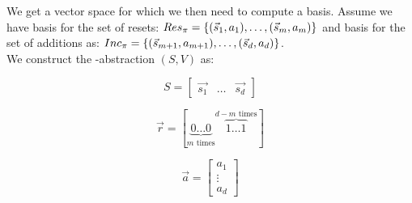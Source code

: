 We get a vector space for which we then need to compute a basis. Assume we have basis for the set of resets:
$Res_\pi = \{(\vec{s}_1, a_1), \ldots, (\vec{s}_m, a_m)\}$ and basis for the set of additions as: $Inc_\pi = \{(\vec{s}_{m+1}, a_{m+1}), \ldots, (\vec{s}_d, a_d)\}$. \\ We construct the \qvasr-abstraction $(S, V)$ as: \\
\begin{center}
\begin{minipage}{0.3\linewidth}
	\begin{equation*}
		S = \begin{bmatrix} \vec{s_1} & \ldots & \vec{s_d} \end{bmatrix}
	\end{equation*}
\end{minipage}
\begin{minipage}{0.3\linewidth}
	\begin{equation*}
		\vec{r} = [ \underbrace{0 \ldots 0}_{m\text{ times}} \overbrace{1 \ldots 1}^{d - m \text{ times}} ]
	\end{equation*}
\end{minipage}
\begin{minipage}{0.3\linewidth}
	\begin{equation*}
		\vec{a} = \begin{bmatrix} a_1 \\ \vdots \\ a_d \end{bmatrix}
	\end{equation*}
\end{minipage}
\end{center}

